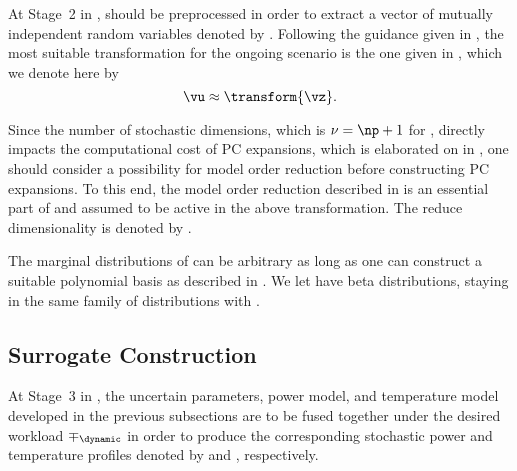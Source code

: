 At Stage~2 in , \vu should be preprocessed in order to
extract a vector of mutually independent random variables denoted by \vz.
Following the guidance given in , the
most suitable transformation for the ongoing scenario is the one given in
, which we denote here by
\[
  \vu \approx \transform{\vz}.
\]

Since the number of stochastic dimensions, which is $\nu = \np + 1$ for \vu,
directly impacts the computational cost of \ac{PC} expansions, which is
elaborated on in , one should consider a
possibility for model order reduction before constructing \ac{PC} expansions. To
this end, the model order reduction described in
 is an essential part of and assumed to be
active in the above transformation. The reduce dimensionality is denoted by \nz.

The marginal distributions of \vz can be arbitrary as long as one can construct
a suitable polynomial basis as described in .
We let \vz have beta distributions, staying in the same family of distributions
with \vu.

\subsection{Surrogate Construction}

At Stage~3 in , the uncertain parameters, power model, and
temperature model developed in the previous subsections are to be fused together
under the desired workload $\mp_\dynamic$ in order to produce the corresponding
stochastic power and temperature profiles denoted by \mp and \mq, respectively.


